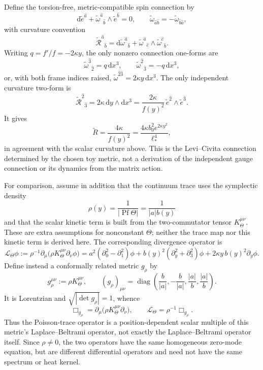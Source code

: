 \begin{remark}
Define the torsion-free, metric-compatible spin connection by
\[
  \mathrm{d}\tilde e^{\hat a}
  +\tilde\omega^{\hat a}{}_{\hat b}
       \wedge\tilde e^{\hat b}=0,\qquad
  \tilde\omega_{\hat a\hat b}
  =-\tilde\omega_{\hat b\hat a},
\]
with curvature convention
\[
  \tilde{\mathcal R}^{\hat a}{}_{\hat b}
  =\mathrm{d}\tilde\omega^{\hat a}{}_{\hat b}
   +\tilde\omega^{\hat a}{}_{\hat c}\wedge
    \tilde\omega^{\hat c}{}_{\hat b}.
\]
Writing \(q=f'/f=-2\kappa y\), the only nonzero connection
one-forms are
\[
  \tilde\omega^{\hat 3}{}_{\hat 2}
       =q\,\mathrm{d}x^3,\qquad
  \tilde\omega^{\hat 2}{}_{\hat 3}
       =-q\,\mathrm{d}x^3,
\]
or, with both frame indices raised,
\(\tilde\omega^{\hat 2\hat 3}=2\kappa y\,\mathrm{d}x^3\).
The only independent curvature two-form is
\[
  \tilde{\mathcal R}^{\hat 2}{}_{\hat 3}
  =2\kappa\,\mathrm{d}y\wedge\mathrm{d}x^3
  =\frac{2\kappa}{f(y)^2}\,
       \tilde e^{\hat 2}\wedge\tilde e^{\hat 3}.
\]
It gives
\[
  \tilde R=\frac{4\kappa}{f(y)^2}
  =\frac{4\kappa b_0^2e^{2\kappa y^2}}{\ell_*^4},
\]
in agreement with the scalar curvature above. This is the
Levi--Civita connection determined by the chosen toy metric, not a
derivation of the independent gauge connection or its dynamics from
the matrix action.

For comparison, assume in addition that the continuum trace uses
the symplectic density
\[
  \rho(y)=\frac{1}{|\operatorname{Pf}\Theta|}
         =\frac{1}{|a|b(y)}
\]
and that the scalar kinetic term is built from the two-commutator
tensor \(K_\Theta^{\mu\nu}\). These are extra assumptions for
nonconstant \(\Theta\); neither the trace map nor this kinetic term
is derived here. The corresponding divergence operator is
\[
  \mathcal L_\Theta\phi
  :=\rho^{-1}\partial_\mu
       \bigl(\rho K_\Theta^{\mu\nu}\partial_\nu\phi\bigr)
  =a^2(\partial_0^2-\partial_1^2)\phi
    +b(y)^2(\partial_y^2+\partial_3^2)\phi
    +2\kappa y\,b(y)^2\partial_y\phi .
\]
Define instead a conformally related metric \(g_\rho\) by
\[
  g_\rho^{\mu\nu}:=\rho K_\Theta^{\mu\nu},
  \qquad
  (g_\rho)_{\mu\nu}
  =\operatorname{diag}\!\left(
      \frac{b}{|a|},-\frac{b}{|a|},
      \frac{|a|}{b},\frac{|a|}{b}\right).
\]
It is Lorentzian and \(\sqrt{|\det g_\rho|}=1\), whence
\[
  \Box_{g_\rho}
  =\partial_\mu\bigl(\rho K_\Theta^{\mu\nu}\partial_\nu\bigr),
  \qquad
  \mathcal L_\Theta=\rho^{-1}\Box_{g_\rho}.
\]
Thus the Poisson-trace operator is a position-dependent scalar
multiple of this metric's Laplace--Beltrami operator, not exactly
the Laplace--Beltrami operator itself. Since \(\rho\ne0\), the two
operators have the same homogeneous zero-mode equation, but are
different differential operators and need not have the same
spectrum or heat kernel.


\end{remark}
